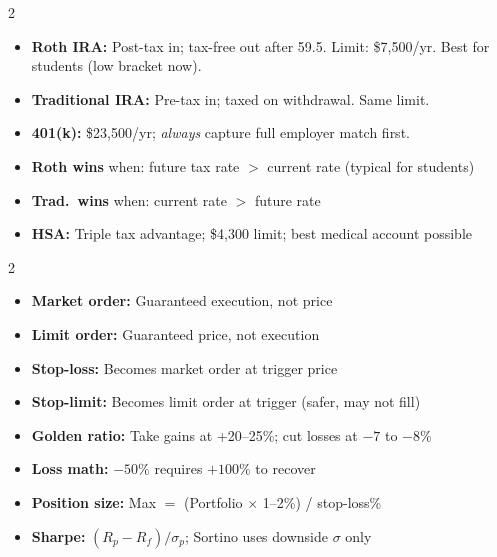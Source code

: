 \documentclass[11pt, letterpaper]{article}
\begin{document}
\begin{tcolorbox}[colback=partbg, colframe=sectionblue,
  title={\bfseries Retirement Accounts (2026)}, arc=3pt, boxrule=1pt]
\footnotesize
\begin{multicols}{2}
\begin{itemize}[noitemsep, leftmargin=*]
  \item \textbf{Roth IRA:} Post-tax in; tax-free out after 59.5. Limit: \$7{,}500/yr. Best for students (low bracket now).
  \item \textbf{Traditional IRA:} Pre-tax in; taxed on withdrawal. Same limit.
  \item \textbf{401(k):} \$23{,}500/yr; \emph{always} capture full employer match first.
\end{itemize}
\columnbreak
\begin{itemize}[noitemsep, leftmargin=*]
  \item \textbf{Roth wins} when: future tax rate $>$ current rate (typical for students)
  \item \textbf{Trad.\ wins} when: current rate $>$ future rate
  \item \textbf{HSA:} Triple tax advantage; \$4{,}300 limit; best medical account possible
\end{itemize}
\end{multicols}
\end{tcolorbox}

\vspace{4pt}

\begin{tcolorbox}[colback=part6bg, colframe=sectionred,
  title={\bfseries Trading Mechanics \& Risk Management}, arc=3pt, boxrule=1pt]
\footnotesize
\begin{multicols}{2}
\begin{itemize}[noitemsep, leftmargin=*]
  \item \textbf{Market order:} Guaranteed execution, not price
  \item \textbf{Limit order:} Guaranteed price, not execution
  \item \textbf{Stop-loss:} Becomes market order at trigger price
  \item \textbf{Stop-limit:} Becomes limit order at trigger (safer, may not fill)
\end{itemize}
\columnbreak
\begin{itemize}[noitemsep, leftmargin=*]
  \item \textbf{Golden ratio:} Take gains at +20--25\%; cut losses at $-7$ to $-8$\%
  \item \textbf{Loss math:} $-50\%$ requires $+100\%$ to recover
  \item \textbf{Position size:} Max $=$ (Portfolio $\times$ 1--2\%) / stop-loss\%
  \item \textbf{Sharpe:} $(R_p - R_f)/\sigma_p$; Sortino uses downside $\sigma$ only
\end{itemize}
\end{multicols}
\end{tcolorbox}
\end{document}
